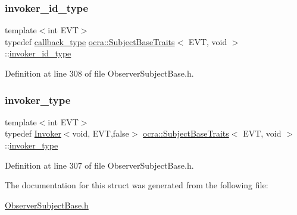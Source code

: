 \subsubsection{\texorpdfstring{invoker\+\_\+id\+\_\+type}{invoker\_id\_type}}
{\footnotesize\ttfamily template$<$int E\+VT$>$ \\
typedef \hyperlink{structocra_1_1SubjectBaseTraits_3_01EVT_00_01void_01_4_a805e01034816edb44ee4269aba6c5beb}{callback\+\_\+type} \hyperlink{structocra_1_1SubjectBaseTraits}{ocra\+::\+Subject\+Base\+Traits}$<$ E\+VT, void $>$\+::\hyperlink{structocra_1_1SubjectBaseTraits_3_01EVT_00_01void_01_4_a35ce9f06a9f2a9e766ad2fb892283d08}{invoker\+\_\+id\+\_\+type}}



Definition at line 308 of file Observer\+Subject\+Base.\+h.

\hypertarget{structocra_1_1SubjectBaseTraits_3_01EVT_00_01void_01_4_af6c08a6cdc4753f4246a8eebaf73152c}{}\label{structocra_1_1SubjectBaseTraits_3_01EVT_00_01void_01_4_af6c08a6cdc4753f4246a8eebaf73152c} 
\subsubsection{\texorpdfstring{invoker\+\_\+type}{invoker\_type}}
{\footnotesize\ttfamily template$<$int E\+VT$>$ \\
typedef \hyperlink{classocra_1_1Invoker}{Invoker}$<$void, E\+VT,false$>$ \hyperlink{structocra_1_1SubjectBaseTraits}{ocra\+::\+Subject\+Base\+Traits}$<$ E\+VT, void $>$\+::\hyperlink{structocra_1_1SubjectBaseTraits_3_01EVT_00_01void_01_4_af6c08a6cdc4753f4246a8eebaf73152c}{invoker\+\_\+type}}



Definition at line 307 of file Observer\+Subject\+Base.\+h.



The documentation for this struct was generated from the following file\+:\begin{DoxyCompactItemize}
\item 
\hyperlink{ObserverSubjectBase_8h}{Observer\+Subject\+Base.\+h}\end{DoxyCompactItemize}
